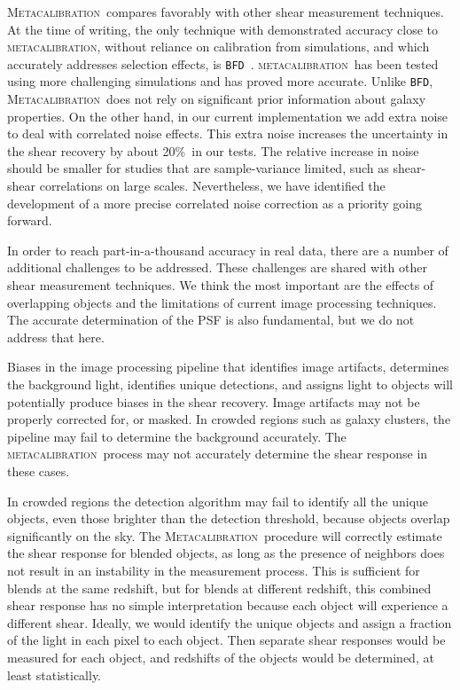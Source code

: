 \documentclass[iop, twocolappendix, appendixfloats, numberedappendix, apj]{emulateapj}
\newcommand{\degrade}{20\%}
\newcommand{\mcal}{\textsc{metacalibration}}
\newcommand{\Mcal}{\textsc{Metacalibration}}
\newcommand{\bfd}{\texttt{BFD}}
\begin{document}
\Mcal\ compares favorably with other shear measurement techniques.  At the time
of writing, the only technique with demonstrated accuracy close to \mcal,
without reliance on calibration from simulations, and which accurately
addresses selection effects, is \bfd\ \citep{bfd2016}.  \mcal\ has been tested
using more challenging simulations and has proved more accurate.  Unlike \bfd,
\Mcal\ does not rely on significant prior information about galaxy properties.
On the other hand, in our current implementation we add extra noise to deal
with correlated noise effects.  This extra noise increases the uncertainty in
the shear recovery by about \degrade\ in our tests. The relative increase in
noise should be smaller for studies that are sample-variance limited, such as
shear-shear correlations on large scales. Nevertheless, we have identified the
development of a more precise correlated noise correction as a priority going
forward.

In order to reach part-in-a-thousand accuracy in real data, there are a number
of additional challenges to be addressed.  These challenges are shared with
other shear measurement techniques.  We think the most important are the
effects of overlapping objects and the limitations of current image processing
techniques. The accurate determination of the PSF is also fundamental, but we
do not address that here.

Biases in the image processing pipeline that identifies image artifacts,
determines the background light, identifies unique detections, and assigns
light to objects will potentially produce biases in the shear recovery.  Image
artifacts may not be properly corrected for, or masked.  In crowded regions
such as galaxy clusters, the pipeline may fail to determine the background
accurately.  The \mcal\ process may not accurately determine the shear response
in these cases.

In crowded regions the detection algorithm may fail to identify all the unique
objects, even those brighter than the detection threshold, because objects
overlap significantly on the sky.  The \Mcal\ procedure will correctly estimate
the shear response for blended objects, as long as the presence of neighbors
does not result in an instability in the measurement process.  This is
sufficient for blends at the same redshift, but for blends at different
redshift, this combined shear response has no simple interpretation because each
object will experience a different shear.  Ideally, we would identify the unique
objects and assign a fraction of the light in each pixel to each object.  Then
separate shear responses would be measured for each object, and redshifts of
the objects would be determined, at least statistically.
\end{document}

